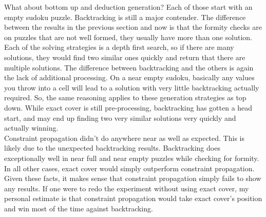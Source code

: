     What about bottom up and deduction generation? Each of those start with an empty sudoku puzzle. Backtracking is still
    a major contender. The difference between the results in the previous section and now is that the formity checks are on puzzles that are
    not well formed, they usually have more than one solution. Each of the solving strategies is a depth first search, so if there are many
    solutions, they would find two similar ones quickly and return that there are multiple solutions. The difference between backtracking
    and the others is again the lack of additional processing. On a near empty sudoku, basically any values you throw into a cell will lead
    to a solution with very little backtracking actually required. So, the same reasoning applies to these generation strategies as top down.
    While exact cover is still pre-processing, backtracking has gotten a head start, and may end up finding two very similar solutions very
    quickly and actually winning.\\
    Constraint propagation didn't do anywhere near as well as expected. This is likely due to the unexpected backtracking results. Backtracking
    does exceptionally well in near full and near empty puzzles while checking for formity. In all other cases, exact cover would simply outperform
    constraint propagation. Given these facts, it makes sense that constraint propagation simply fails to show any results. If one were to redo
    the experiment without using exact cover, my personal estimate is that constraint propagation would take exact cover's position and win
    most of the time against backtracking.

